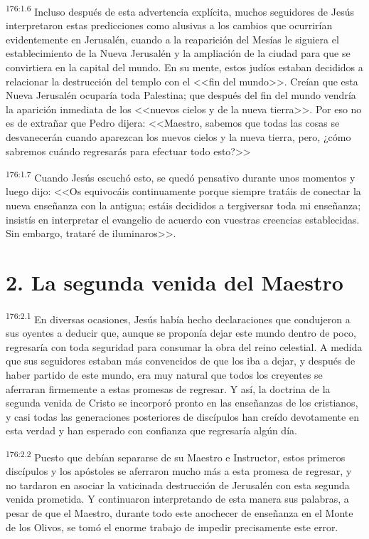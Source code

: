 \par 
\textsuperscript{176:1.6} Incluso después de esta advertencia explícita, muchos seguidores de Jesús interpretaron estas predicciones como alusivas a los cambios que ocurrirían evidentemente en Jerusalén, cuando a la reaparición del Mesías le siguiera el establecimiento de la Nueva Jerusalén y la ampliación de la ciudad para que se convirtiera en la capital del mundo. En su mente, estos judíos estaban decididos a relacionar la destrucción del templo con el <<fin del mundo>>. Creían que esta Nueva Jerusalén ocuparía toda Palestina; que después del fin del mundo vendría la aparición inmediata de los <<nuevos cielos y de la nueva tierra>>. Por eso no es de extrañar que Pedro dijera: <<Maestro, sabemos que todas las cosas se desvanecerán cuando aparezcan los nuevos cielos y la nueva tierra, pero, ¿cómo sabremos cuándo regresarás para efectuar todo esto?>>

\par 
\textsuperscript{176:1.7} Cuando Jesús escuchó esto, se quedó pensativo durante unos momentos y luego dijo: <<Os equivocáis continuamente porque siempre tratáis de conectar la nueva enseñanza con la antigua; estáis decididos a tergiversar toda mi enseñanza; insistís en interpretar el evangelio de acuerdo con vuestras creencias establecidas. Sin embargo, trataré de iluminaros>>.

\section*{2. La segunda venida del Maestro}
\par 
\textsuperscript{176:2.1} En diversas ocasiones, Jesús había hecho declaraciones que condujeron a sus oyentes a deducir que, aunque se proponía dejar este mundo dentro de poco, regresaría con toda seguridad para consumar la obra del reino celestial. A medida que sus seguidores estaban más convencidos de que los iba a dejar, y después de haber partido de este mundo, era muy natural que todos los creyentes se aferraran firmemente a estas promesas de regresar. Y así, la doctrina de la segunda venida de Cristo se incorporó pronto en las enseñanzas de los cristianos, y casi todas las generaciones posteriores de discípulos han creído devotamente en esta verdad y han esperado con confianza que regresaría algún día.

\par 
\textsuperscript{176:2.2} Puesto que debían separarse de su Maestro e Instructor, estos primeros discípulos y los apóstoles se aferraron mucho más a esta promesa de regresar, y no tardaron en asociar la vaticinada destrucción de Jerusalén con esta segunda venida prometida. Y continuaron interpretando de esta manera sus palabras, a pesar de que el Maestro, durante todo este anochecer de enseñanza en el Monte de los Olivos, se tomó el enorme trabajo de impedir precisamente este error.

